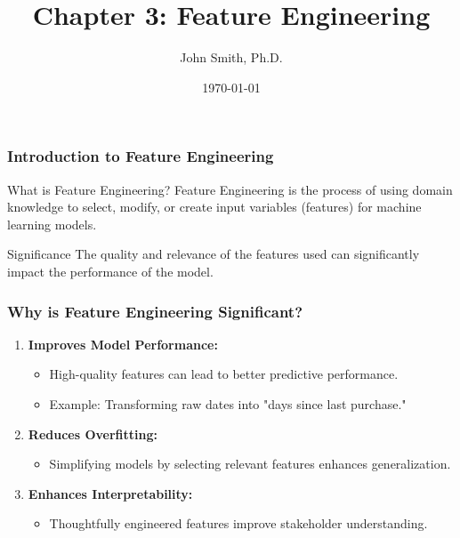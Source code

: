 \documentclass[aspectratio=169]{beamer}
\title[Chapter 3: Feature Engineering]{Chapter 3: Feature Engineering}
\author[J. Smith]{John Smith, Ph.D.}
\institute[University Name]{
  Department of Computer Science\\
  University Name\\
  \vspace{0.3cm}
}
\date{\today}
\begin{document}
\frame{\titlepage}

\begin{frame}[fragile]
    \frametitle{Introduction to Feature Engineering}
    \begin{block}{What is Feature Engineering?}
        Feature Engineering is the process of using domain knowledge to select, modify, or create input variables (features) for machine learning models. 
    \end{block}
    \begin{block}{Significance}
        The quality and relevance of the features used can significantly impact the performance of the model.
    \end{block}
\end{frame}

\begin{frame}[fragile]
    \frametitle{Why is Feature Engineering Significant?}
    \begin{enumerate}
        \item \textbf{Improves Model Performance:}
            \begin{itemize}
                \item High-quality features can lead to better predictive performance.
                \item Example: Transforming raw dates into "days since last purchase."
            \end{itemize}
        \item \textbf{Reduces Overfitting:}
            \begin{itemize}
                \item Simplifying models by selecting relevant features enhances generalization.
            \end{itemize}
        \item \textbf{Enhances Interpretability:}
            \begin{itemize}
                \item Thoughtfully engineered features improve stakeholder understanding.
            \end{itemize}
    \end{enumerate}
\end{frame}
\end{document}
